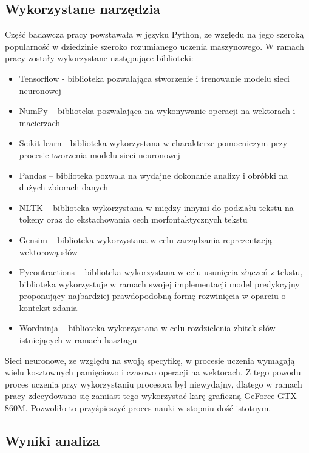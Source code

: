 \subsection{Wykorzystane narzędzia}
Część badawcza pracy powstawała w języku Python, ze względu na jego szeroką popularność w dziedzinie szeroko rozumianego uczenia maszynowego. W ramach pracy zostały wykorzystane następujące biblioteki:
\begin{itemize}
    \item Tensorflow - biblioteka pozwalająca stworzenie i trenowanie modelu sieci neuronowej
    \item NumPy – biblioteka pozwalająca na wykonywanie operacji na wektorach i macierzach
    \item Scikit-learn - biblioteka wykorzystana w charakterze pomocniczym przy procesie tworzenia modelu sieci neuronowej
    \item Pandas – biblioteka pozwala na wydajne dokonanie analizy i obróbki na dużych zbiorach danych
    \item NLTK – biblioteka wykorzystana w między innymi do podziału tekstu na tokeny oraz do ekstachowania cech morfontaktycznych tekstu
    \item Gensim – biblioteka wykorzystana w celu zarządzania reprezentacją wektorową słów
    \item Pycontractions – biblioteka wykorzystana w celu usunięcia złączeń z tekstu, biblioteka wykorzystuje w ramach swojej implementacji model predykcyjny proponujący najbardziej prawdopodobną formę rozwinięcia w oparciu o kontekst zdania
    \item Wordninja – biblioteka wykorzystana w celu rozdzielenia zbitek słów istniejących w ramach hasztagu
\end{itemize}

Sieci neuronowe, ze względu na swoją specyfikę, w procesie uczenia wymagają wielu kosztownych pamięciowo i czasowo operacji na wektorach. Z tego powodu proces uczenia przy wykorzystaniu procesora był niewydajny, dlatego w ramach pracy zdecydowano się zamiast tego wykorzystać karę graficzną GeForce GTX 860M. Pozwoliło to przyśpieszyć proces nauki w stopniu dość istotnym.





\subsection{Wyniki analiza}

